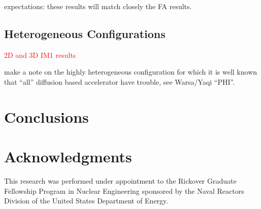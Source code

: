 \documentclass[preprint,10pt]{elsarticle}
\newcommand{\tcr}[1]{\textcolor{red}{#1}}
\begin{document}
expectations: these results will match closely the FA results.

\subsection{Heterogeneous Configurations}

\tcr{2D and 3D IM1 results}

make a note on the highly heterogeneous configuration for which it is well known that ``all'' diffusion based accelerator have trouble, see Warsa/Yaqi ``PHI''.
 

\section{Conclusions} \label{sec::conclusions}


\section*{Acknowledgments} 
This research was performed under appointment to the Rickover Graduate Fellowship Program in Nuclear Engineering sponsored by the Naval Reactors Division of the United States Department of Energy.



\end{document}
